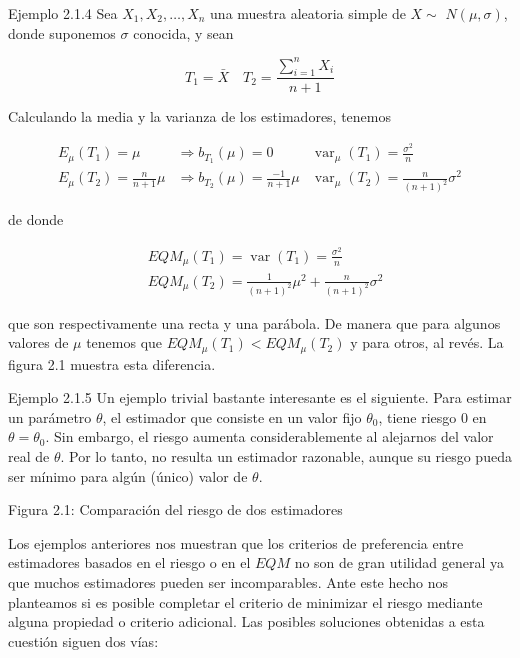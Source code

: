 \documentclass[
]{article}
\begin{document}
Ejemplo 2.1.4 Sea \(X_{1}, X_{2}, \ldots, X_{n}\) una muestra aleatoria simple de \(X \sim\) \(N(\mu, \sigma)\), donde suponemos \(\sigma\) conocida, y sean

\[
T_{1}=\bar{X} \quad T_{2}=\frac{\sum_{i=1}^{n} X_{i}}{n+1}
\]

Calculando la media y la varianza de los estimadores, tenemos

\[
\begin{array}{lll}
E_{\mu}\left(T_{1}\right)=\mu & \Rightarrow b_{T_{1}}(\mu)=0 & \operatorname{var}_{\mu}\left(T_{1}\right)=\frac{\sigma^{2}}{n} \\
E_{\mu}\left(T_{2}\right)=\frac{n}{n+1} \mu & \Rightarrow b_{T_{2}}(\mu)=\frac{-1}{n+1} \mu & \operatorname{var}_{\mu}\left(T_{2}\right)=\frac{n}{(n+1)^{2}} \sigma^{2}
\end{array}
\]

de donde

\[
\begin{aligned}
& E Q M_{\mu}\left(T_{1}\right)=\operatorname{var}\left(T_{1}\right)=\frac{\sigma^{2}}{n} \\
& E Q M_{\mu}\left(T_{2}\right)=\frac{1}{(n+1)^{2}} \mu^{2}+\frac{n}{(n+1)^{2}} \sigma^{2}
\end{aligned}
\]

que son respectivamente una recta y una parábola. De manera que para algunos valores de \(\mu\) tenemos que \(E Q M_{\mu}\left(T_{1}\right)<E Q M_{\mu}\left(T_{2}\right)\) y para otros, al revés. La figura 2.1 muestra esta diferencia.

Ejemplo 2.1.5 Un ejemplo trivial bastante interesante es el siguiente. Para estimar un parámetro \(\theta\), el estimador que consiste en un valor fijo \(\theta_{0}\), tiene riesgo 0 en \(\theta=\theta_{0}\). Sin embargo, el riesgo aumenta considerablemente al alejarnos del valor real de \(\theta\). Por lo tanto, no resulta un estimador razonable, aunque su riesgo pueda ser mínimo para algún (único) valor de \(\theta\).

Figura 2.1: Comparación del riesgo de dos estimadores

Los ejemplos anteriores nos muestran que los criterios de preferencia entre estimadores basados en el riesgo o en el \(E Q M\) no son de gran utilidad general ya que muchos estimadores pueden ser incomparables. Ante este hecho nos planteamos si es posible completar el criterio de minimizar el riesgo mediante alguna propiedad o criterio adicional. Las posibles soluciones obtenidas a esta cuestión siguen dos vías:
\end{document}
